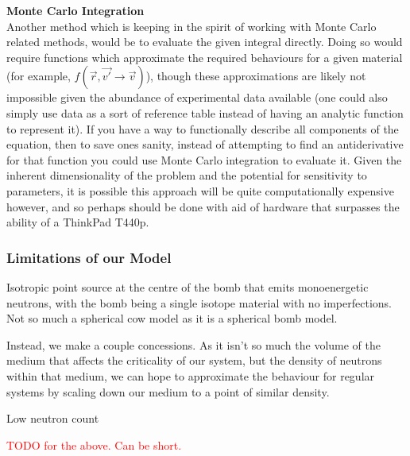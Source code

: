 \noindent \textbf{Monte Carlo Integration} \\
Another method which is keeping in the spirit of working with Monte Carlo related methods, would be to evaluate the given integral directly.
Doing so would require functions which approximate the required behaviours for a given material (for example, $f(\vec{r}, \vec{v'} \to \vec{v})$), 
though these approximations are likely not impossible given the abundance of experimental data available (one could also simply use data as a sort of 
reference table instead of having an analytic function to represent it). If you have a way to functionally describe all components of the equation, then 
to save ones sanity, instead of attempting to find an antiderivative for that function you could use Monte Carlo integration to evaluate it. 
Given the inherent dimensionality of the problem and the potential for sensitivity to parameters, it is possible this approach will be quite 
computationally expensive however, and so perhaps should be done with aid of hardware that surpasses the ability of a ThinkPad T440p.

\subsubsection{Limitations of our Model}
Isotropic point source at the centre of the bomb that emits monoenergetic neutrons, with the bomb being a single 
isotope material with no imperfections. Not so much a spherical cow model as it is a spherical bomb model.

Instead, we make a couple 
concessions. As it isn't so much the volume of the medium that affects the criticality of our system, but the density of 
neutrons within that medium, we can hope to approximate the behaviour for regular systems by scaling down our medium to a point 
of similar density. 

Low neutron count

\textcolor{red}{TODO for the above. Can be short.}